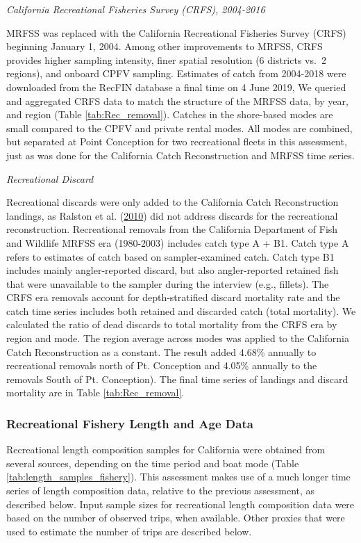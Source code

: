 \documentclass[12pt,]{article}
\begin{document}
\emph{California Recreational Fisheries Survey (CRFS), 2004-2016}

MRFSS was replaced with the California Recreational Fisheries Survey
(CRFS) beginning January 1, 2004. Among other improvements to MRFSS,
CRFS provides higher sampling intensity, finer spatial resolution (6
districts vs.~2 regions), and onboard CPFV sampling. Estimates of catch
from 2004-2018 were downloaded from the RecFIN database a final time on
4 June 2019, We queried and aggregated CRFS data to match the structure
of the MRFSS data, by year, and region (Table \ref{tab:Rec_removal}).
Catches in the shore-based modes are small compared to the CPFV and
private rental modes. All modes are combined, but separated at Point
Conception for two recreational fleets in this assessment, just as was
done for the California Catch Reconstruction and MRFSS time series.

\emph{Recreational Discard}

Recreational discards were only added to the California Catch
Reconstruction landings, as Ralston et al.
(\protect\hyperlink{ref-Ralston2010}{2010}) did not address discards for
the recreational reconstruction. Recreational removals from the
California Department of Fish and Wildlife MRFSS era (1980-2003)
includes catch type A + B1. Catch type A refers to estimates of catch
based on sampler-examined catch. Catch type B1 includes mainly
angler-reported discard, but also angler-reported retained fish that
were unavailable to the sampler during the interview (e.g., fillets).
The CRFS era removals account for depth-stratified discard mortality
rate and the catch time series includes both retained and discarded
catch (total mortality). We calculated the ratio of dead discards to
total mortality from the CRFS era by region and mode. The region average
across modes was applied to the California Catch Reconstruction as a
constant. The result added 4.68\% annually to recreational removals
north of Pt. Conception and 4.05\% annually to the removals South of Pt.
Conception). The final time series of landings and discard mortality are
in Table \ref{tab:Rec_removal}.

\subsubsection{Recreational Fishery Length and Age
Data}\label{recreational-fishery-length-and-age-data}

Recreational length composition samples for California were obtained
from several sources, depending on the time period and boat mode (Table
\ref{tab:length_samples_fishery}). This assessment makes use of a much
longer time series of length composition data, relative to the previous
assessment, as described below. Input sample sizes for recreational
length composition data were based on the number of observed trips, when
available. Other proxies that were used to estimate the number of trips
are described below.
\end{document}
